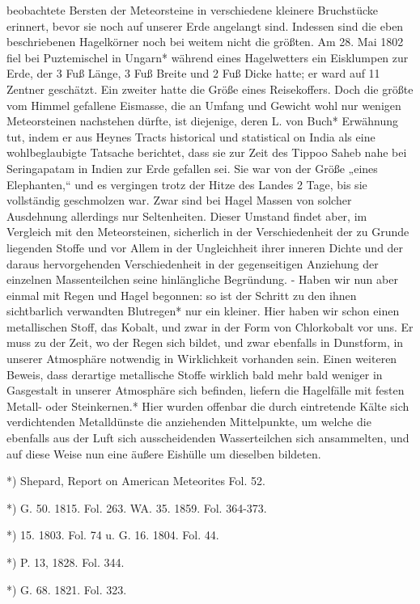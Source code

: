 \documentclass[a4paper, 11pt, oneside, polutonikogreek, german]{article}
\begin{document}
beobachtete Bersten der Meteorsteine in verschiedene kleinere Bruchstücke erinnert, bevor sie noch auf unserer Erde angelangt sind. Indessen sind die eben beschriebenen Hagelkörner noch bei weitem nicht die größten. Am 28. Mai 1802 fiel bei Puztemischel in Ungarn* während eines Hagelwetters ein Eisklumpen zur Erde, der 3 Fuß Länge, 3 Fuß Breite und 2 Fuß Dicke hatte; er ward auf 11 Zentner geschätzt. Ein zweiter hatte die Größe eines Reisekoffers. Doch die größte vom Himmel gefallene Eismasse, die an Umfang und Gewicht wohl nur wenigen Meteorsteinen nachstehen dürfte, ist diejenige, deren L. von Buch* Erwähnung tut, indem er aus Heynes Tracts historical und statistical on India als eine wohlbeglaubigte Tatsache berichtet, dass sie zur Zeit des Tippoo Saheb nahe bei Seringapatam in Indien zur Erde gefallen sei. Sie war von der Größe „eines Elephanten,“ und es vergingen trotz der Hitze des Landes 2 Tage, bis sie vollständig geschmolzen war. Zwar sind bei Hagel Massen von solcher Ausdehnung allerdings nur Seltenheiten. Dieser Umstand findet aber, im Vergleich mit den Meteorsteinen, sicherlich in der Verschiedenheit der zu Grunde liegenden Stoffe und vor Allem in der Ungleichheit ihrer inneren Dichte und der daraus hervorgehenden Verschiedenheit in der gegenseitigen Anziehung der einzelnen Massenteilchen seine hinlängliche Begründung. - Haben wir nun aber einmal mit Regen und Hagel begonnen: so ist der Schritt zu den ihnen sichtbarlich verwandten Blutregen* nur ein kleiner. Hier haben wir schon einen metallischen Stoff, das Kobalt, und zwar in der Form von Chlorkobalt vor uns. Er muss zu der Zeit, wo der Regen sich bildet, und zwar ebenfalls in Dunstform, in unserer Atmosphäre notwendig in Wirklichkeit vorhanden sein. Einen weiteren Beweis, dass derartige metallische Stoffe wirklich bald mehr bald weniger in Gasgestalt in unserer Atmosphäre sich befinden, liefern die Hagelfälle mit festen Metall- oder Steinkernen.* Hier wurden offenbar die durch eintretende Kälte sich verdichtenden Metalldünste die anziehenden Mittelpunkte, um welche die ebenfalls aus der Luft sich ausscheidenden Wasserteilchen sich ansammelten, und auf diese Weise nun eine äußere Eishülle um dieselben bildeten.

*) Shepard, Report on American Meteorites Fol. 52.

*) G. 50. 1815. Fol. 263. WA. 35. 1859. Fol. 364-373.

*) 15. 1803. Fol. 74 u. G. 16. 1804. Fol. 44.

*) P. 13, 1828. Fol. 344.

*) G. 68. 1821. Fol. 323.
\end{document}
